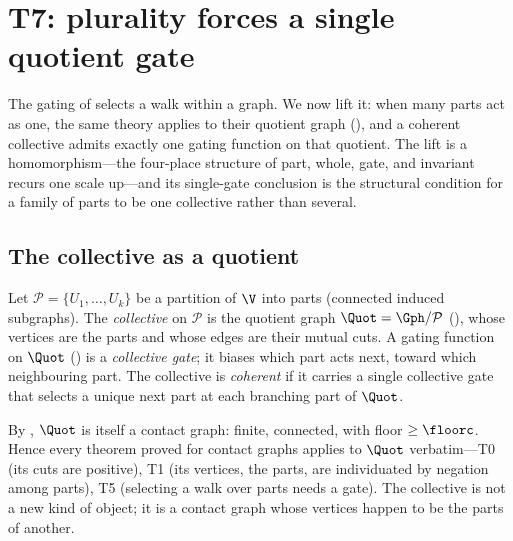 
\section{T7: plurality forces a single quotient gate}
\label{sec:quotient}

The gating of  selects a walk within a graph. We now lift it:
when many parts act as one, the same theory applies to their quotient graph
(), and a coherent collective admits exactly one gating
function on that quotient. The lift is a homomorphism---the four-place structure
of part, whole, gate, and invariant recurs one scale up---and its single-gate
conclusion is the structural condition for a family of parts to be one
collective rather than several.

\subsection{The collective as a quotient}

\begin{definition}
\label{def:collective}
Let $\mathcal{P}=\{U_1,\dots,U_k\}$ be a partition of $\V$ into parts (connected
induced subgraphs). The \emph{collective} on $\mathcal{P}$ is the quotient graph
$\Quot=\Gph/\mathcal{P}$ (), whose vertices are the parts and
whose edges are their mutual cuts. A gating function on $\Quot$
() is a \emph{collective gate}; it biases which part acts next,
toward which neighbouring part. The collective is \emph{coherent} if it carries a
single collective gate that selects a unique next part at each branching part of
$\Quot$.
\end{definition}

\begin{remark}
\label{rem:lift}
By , $\Quot$ is itself a contact graph: finite,
connected, with floor $\ge\floorc$. Hence every theorem proved for contact graphs
applies to $\Quot$ verbatim---T0 (its cuts are positive), T1 (its vertices, the
parts, are individuated by negation among parts), T5 (selecting a walk over parts
needs a gate). The collective is not a new kind of object; it is a contact graph
whose vertices happen to be the parts of another.
\end{remark}

